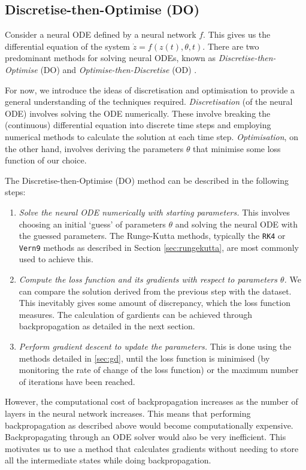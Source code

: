 \documentclass[a4paper,11pt,titlepage]{article}
\theoremstyle{definition}
\theoremstyle{plain}
\theoremstyle{remark}
\begin{document}
\subsection{Discretise-then-Optimise (DO)}
\label{sec:do}

Consider a neural ODE defined by a neural network $f$. This gives us the differential equation of the system $\dot{z}=f(z(t),\theta,t)$. There are two predominant methods for solving neural ODEs, known as \textit{Discretise-then-Optimise} (DO) and \textit{Optimise-then-Discretise} (OD) \cite{kidger2022neural}.

For now, we introduce the ideas of discretisation and optimisation to provide a general understanding of the techniques required. \textit{Discretisation} (of the neural ODE) involves solving the ODE numerically. These involve breaking the (continuous) differential equation into discrete time steps and employing numerical methods to calculate the solution at each time step. \textit{Optimisation}, on the other hand, involves deriving the parameters $\theta$ that minimise some loss function of our choice.

The Discretise-then-Optimise (DO) method can be described in the following steps:
\begin{enumerate}
    \item \textit{Solve the neural ODE numerically with starting parameters.} This involves choosing an initial ‘guess’ of parameters $\theta$ and solving the neural ODE with the guessed parameters. The Runge-Kutta methods, typically the \texttt{RK4} or \texttt{Vern9} methods as described in Section \ref{sec:rungekutta}, are most commonly used to achieve this.
    \item \textit{Compute the loss function and its gradients with respect to parameters $\theta$.} We can compare the solution derived from the previous step with the dataset. This inevitably gives some amount of discrepancy, which the loss function measures. The calculation of gardients can be achieved through backpropagation as detailed in the next section.
    \item \textit{Perform gradient descent to update the parameters.} This is done using the methods detailed in \ref{sec:gd}, until the loss function is minimised (by monitoring the rate of change of the loss function) or the maximum number of iterations have been reached.
\end{enumerate}

However, the computational cost of backpropagation increases as the number of layers in the neural network increases. This means that performing backpropagation as described above would become computationally expensive. Backpropagating through an ODE solver would also be very inefficient. This motivates us to use a method that calculates gradients without needing to store all the intermediate states while doing backpropagation.
\end{document}
